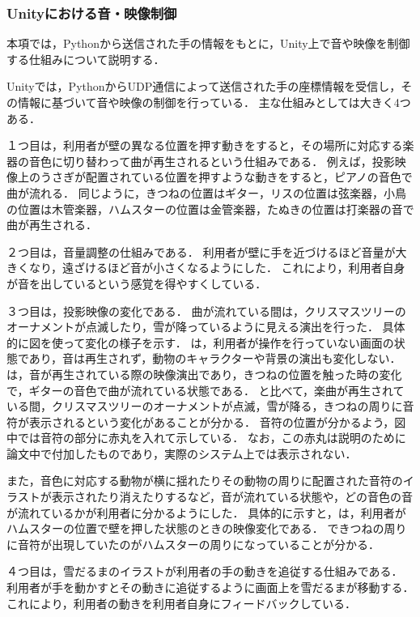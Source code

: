 \subsubsection{Unityにおける音・映像制御}
本項では，Pythonから送信された手の情報をもとに，Unity上で音や映像を制御する仕組みについて説明する．

Unityでは，PythonからUDP通信によって送信された手の座標情報を受信し，その情報に基づいて音や映像の制御を行っている．
主な仕組みとしては大きく4つある．

１つ目は，利用者が壁の異なる位置を押す動きをすると，その場所に対応する楽器の音色に切り替わって曲が再生されるという仕組みである．
例えば，投影映像上のうさぎが配置されている位置を押すような動きをすると，ピアノの音色で曲が流れる．
同じように，きつねの位置はギター，リスの位置は弦楽器，小鳥の位置は木管楽器，ハムスターの位置は金管楽器，たぬきの位置は打楽器の音で曲が再生される．


２つ目は，音量調整の仕組みである．
利用者が壁に手を近づけるほど音量が大きくなり，遠ざけるほど音が小さくなるようにした．
これにより，利用者自身が音を出しているという感覚を得やすくしている．

３つ目は，投影映像の変化である．
曲が流れている間は，クリスマスツリーのオーナメントが点滅したり，雪が降っているように見える演出を行った．
具体的に図を使って変化の様子を示す．
は，利用者が操作を行っていない画面の状態であり，音は再生されず，動物のキャラクターや背景の演出も変化しない．
は，音が再生されている際の映像演出であり，きつねの位置を触った時の変化で，ギターの音色で曲が流れている状態である．
と比べて，楽曲が再生されている間，クリスマスツリーのオーナメントが点滅，雪が降る，きつねの周りに音符が表示されるという変化があることが分かる．
音符の位置が分かるよう，図中では音符の部分に赤丸を入れて示している．
なお，この赤丸は説明のために論文中で付加したものであり，実際のシステム上では表示されない．

また，音色に対応する動物が横に揺れたりその動物の周りに配置された音符のイラストが表示されたり消えたりするなど，音が流れている状態や，どの音色の音が流れているかが利用者に分かるようにした．
具体的に示すと，は，利用者がハムスターの位置で壁を押した状態のときの映像変化である．
できつねの周りに音符が出現していたのがハムスターの周りになっていることが分かる．



４つ目は，雪だるまのイラストが利用者の手の動きを追従する仕組みである．
利用者が手を動かすとその動きに追従するように画面上を雪だるまが移動する．
これにより，利用者の動きを利用者自身にフィードバックしている．


